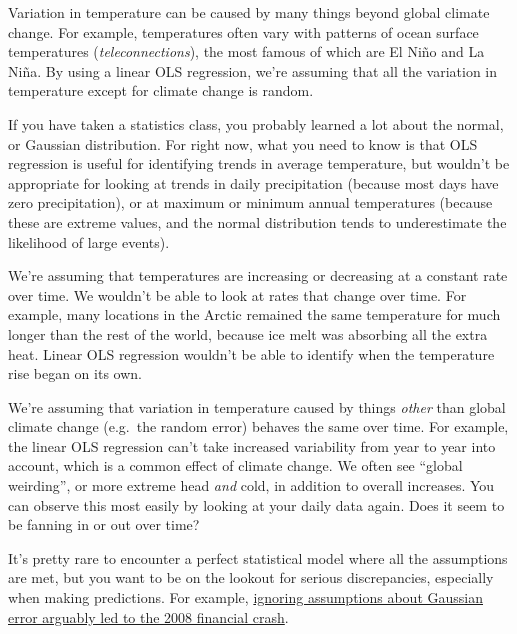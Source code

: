 \documentclass[
  letterpaper,
  DIV=11,
  numbers=noendperiod,
  oneside]{scrreprt}
\providecommand{\tightlist}{%
  \setlength{\itemsep}{0pt}\setlength{\parskip}{0pt}}
\begin{document}
\begin{description}
\tightlist
\item[Random error]
Variation in temperature can be caused by many things beyond global
climate change. For example, temperatures often vary with patterns of
ocean surface temperatures (\emph{teleconnections}), the most famous of
which are El Niño and La Niña. By using a linear OLS regression, we're
assuming that all the variation in temperature except for climate change
is random.
\item[Normally distributed error]
If you have taken a statistics class, you probably learned a lot about
the normal, or Gaussian distribution. For right now, what you need to
know is that OLS regression is useful for identifying trends in average
temperature, but wouldn't be appropriate for looking at trends in daily
precipitation (because most days have zero precipitation), or at maximum
or minimum annual temperatures (because these are extreme values, and
the normal distribution tends to underestimate the likelihood of large
events).
\item[Linearity]
We're assuming that temperatures are increasing or decreasing at a
constant rate over time. We wouldn't be able to look at rates that
change over time. For example, many locations in the Arctic remained the
same temperature for much longer than the rest of the world, because ice
melt was absorbing all the extra heat. Linear OLS regression wouldn't be
able to identify when the temperature rise began on its own.
\item[Stationarity]
We're assuming that variation in temperature caused by things
\emph{other} than global climate change (e.g.~the random error) behaves
the same over time. For example, the linear OLS regression can't take
increased variability from year to year into account, which is a common
effect of climate change. We often see ``global weirding'', or more
extreme head \emph{and} cold, in addition to overall increases. You can
observe this most easily by looking at your daily data again. Does it
seem to be fanning in or out over time?
\end{description}

It's pretty rare to encounter a perfect statistical model where all the
assumptions are met, but you want to be on the lookout for serious
discrepancies, especially when making predictions. For example,
\href{https://www.wired.com/2009/02/wp-quant/}{ignoring assumptions
about Gaussian error arguably led to the 2008 financial crash}.
\end{document}
